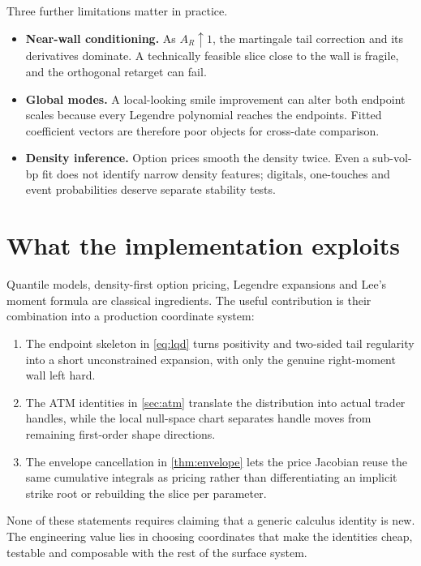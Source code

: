 \documentclass[11pt]{article}
\begin{document}
Three further limitations matter in practice.
\begin{itemize}[leftmargin=1.4em]
\item \textbf{Near-wall conditioning.}  As $A_R\uparrow1$, the martingale tail
correction and its derivatives dominate.  A technically feasible slice close
to the wall is fragile, and the orthogonal retarget can fail.
\item \textbf{Global modes.}  A local-looking smile improvement can alter both
endpoint scales because every Legendre polynomial reaches the endpoints.
Fitted coefficient vectors are therefore poor objects for cross-date comparison.
\item \textbf{Density inference.}  Option prices smooth the density twice.
Even a sub-vol-bp fit does not identify narrow density features; digitals,
one-touches and event probabilities deserve separate stability tests.
\end{itemize}

\section{What the implementation exploits}
\label{sec:contributions}

Quantile models, density-first option pricing, Legendre expansions and Lee's
moment formula are classical ingredients.  The useful contribution is their
combination into a production coordinate system:
\begin{enumerate}[leftmargin=1.6em]
\item The endpoint skeleton in \eqref{eq:lqd} turns positivity and two-sided
tail regularity into a short unconstrained expansion, with only the genuine
right-moment wall left hard.
\item The ATM identities in \cref{sec:atm} translate the distribution into
actual trader handles, while the local null-space chart separates handle moves
from remaining first-order shape directions.
\item The envelope cancellation in \cref{thm:envelope} lets the price Jacobian
reuse the same cumulative integrals as pricing rather than differentiating an
implicit strike root or rebuilding the slice per parameter.
\end{enumerate}
None of these statements requires claiming that a generic calculus identity is
new.  The engineering value lies in choosing coordinates that make the
identities cheap, testable and composable with the rest of the surface system.
\end{document}
